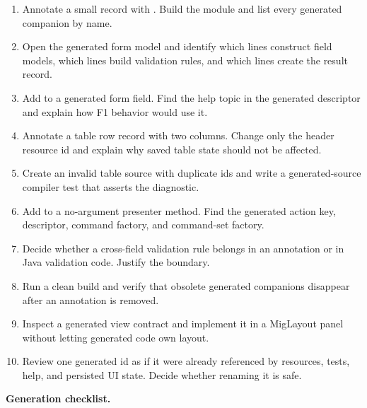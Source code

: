 \begin{exercisebox}
\begin{enumerate}
\item Annotate a small record with . Build the module and list
every generated companion by name.
\item Open the generated form model and identify which lines construct field
models, which lines build validation rules, and which lines create the result
record.
\item Add  to a generated form field. Find the help
topic in the generated descriptor and explain how F1 behavior would use it.
\item Annotate a table row record with two columns. Change only the header
resource id and explain why saved table state should not be affected.
\item Create an invalid table source with duplicate  ids and
write a generated-source compiler test that asserts the diagnostic.
\item Add  to a no-argument presenter method. Find the generated
action key, descriptor, command factory, and command-set factory.
\item Decide whether a cross-field validation rule belongs in an annotation or
in Java validation code. Justify the boundary.
\item Run a clean build and verify that obsolete generated companions disappear
after an annotation is removed.
\item Inspect a generated view contract and implement it in a MigLayout panel
without letting generated code own layout.
\item Review one generated id as if it were already referenced by resources,
tests, help, and persisted UI state. Decide whether renaming it is safe.
\end{enumerate}
\end{exercisebox}

\begin{center}
\textbf{Generation checklist.}
\end{center}

